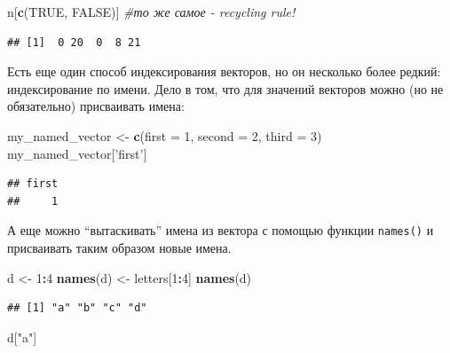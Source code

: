 \documentclass[]{book}
\newenvironment{Shaded}{\begin{snugshade}}{\end{snugshade}}
\newcommand{\KeywordTok}[1]{\textcolor[rgb]{0.13,0.29,0.53}{\textbf{#1}}}
\newcommand{\DataTypeTok}[1]{\textcolor[rgb]{0.13,0.29,0.53}{#1}}
\newcommand{\DecValTok}[1]{\textcolor[rgb]{0.00,0.00,0.81}{#1}}
\newcommand{\StringTok}[1]{\textcolor[rgb]{0.31,0.60,0.02}{#1}}
\newcommand{\CommentTok}[1]{\textcolor[rgb]{0.56,0.35,0.01}{\textit{#1}}}
\newcommand{\OtherTok}[1]{\textcolor[rgb]{0.56,0.35,0.01}{#1}}
\newcommand{\OperatorTok}[1]{\textcolor[rgb]{0.81,0.36,0.00}{\textbf{#1}}}
\newcommand{\NormalTok}[1]{#1}
\begin{document}
\begin{Shaded}
\begin{Highlighting}[]
\NormalTok{n[}\KeywordTok{c}\NormalTok{(}\OtherTok{TRUE}\NormalTok{, }\OtherTok{FALSE}\NormalTok{)] }\CommentTok{#то же самое - recycling rule!}
\end{Highlighting}
\end{Shaded}

\begin{verbatim}
## [1]  0 20  0  8 21
\end{verbatim}

Есть еще один способ индексирования векторов, но он несколько более
редкий: индексирование по имени. Дело в том, что для значений векторов
можно (но не обязательно) присваивать имена:

\begin{Shaded}
\begin{Highlighting}[]
\NormalTok{my_named_vector <-}\StringTok{ }\KeywordTok{c}\NormalTok{(}\DataTypeTok{first =} \DecValTok{1}\NormalTok{,}
                     \DataTypeTok{second =} \DecValTok{2}\NormalTok{,}
                     \DataTypeTok{third =} \DecValTok{3}\NormalTok{)}
\NormalTok{my_named_vector[}\StringTok{'first'}\NormalTok{]}
\end{Highlighting}
\end{Shaded}

\begin{verbatim}
## first 
##     1
\end{verbatim}

А еще можно ``вытаскивать'' имена из вектора с помощью функции
\texttt{names()} и присваивать таким образом новые имена.

\begin{Shaded}
\begin{Highlighting}[]
\NormalTok{d <-}\StringTok{ }\DecValTok{1}\OperatorTok{:}\DecValTok{4}
\KeywordTok{names}\NormalTok{(d) <-}\StringTok{ }\NormalTok{letters[}\DecValTok{1}\OperatorTok{:}\DecValTok{4}\NormalTok{]}
\KeywordTok{names}\NormalTok{(d)}
\end{Highlighting}
\end{Shaded}

\begin{verbatim}
## [1] "a" "b" "c" "d"
\end{verbatim}

\begin{Shaded}
\begin{Highlighting}[]
\NormalTok{d[}\StringTok{"a"}\NormalTok{]}
\end{Highlighting}
\end{Shaded}
\end{document}
